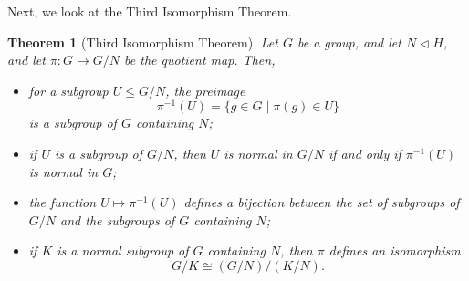 \documentclass[a4paper, openany]{memoir}
\theoremstyle{definition}
\theoremstyle{plain}
\newtheorem{theorem}[definition]{Theorem}
\begin{document}
Next, we look at the Third Isomorphism Theorem.
\begin{theorem}[Third Isomorphism Theorem]
Let $G$ be a group, and let $N \vartriangleleft H$, and let $\pi: G \to G/N$ be the quotient map. Then,
\begin{itemize}
    \item for a subgroup $U \leqslant G/N$, the preimage
    \[\pi^{-1}(U) = \{g \in G \mid \pi(g) \in U\}\]
    is a subgroup of $G$ containing $N$;
    \item if $U$ is a subgroup of $G/N$, then $U$ is normal in $G/N$ if and only if $\pi^{-1}(U)$ is normal in $G$; 
    \item the function $U \mapsto \pi^{-1}(U)$ defines a bijection between the set of subgroups of $G/N$ and the subgroups of $G$ containing $N$;
    \item if $K$ is a normal subgroup of $G$ containing $N$, then $\pi$ defines an isomorphism
    \[G/K \cong (G/N)/(K/N).\]
\end{itemize}
\end{theorem}
\end{document}
